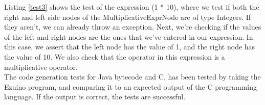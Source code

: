 Listing \ref{test3} shows the test of the expression (1 * 10), where we test if both the right and left side nodes of the MultiplicativeExprNode are of type Integers. If they aren’t, we can already throw an exception. Next, we’re checking if the values of the left and right nodes are the ones that we’ve entered in our expression. In this case, we assert that the left node has the value of 1, and the right node has the value of 10. We also check that the operator in this expression is a multiplicative operator.\\
The code generation tests for Java bytecode and C, has been tested by taking the Ezuino program, and comparing it to an expected output of the C programming language. If the output is correct, the tests are successful.

\noindent\newline

